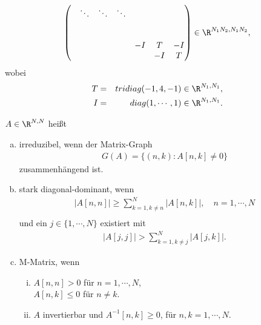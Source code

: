 \begin{Beispiel}
\begin{eqnarray*}
\begin{pmatrix}
                          & \ddots & \ddots & \ddots & & & \\
                          \\
                          \\
                          & & & & -I & T & -I \\
                          & & & & & -I & T
                       \end{pmatrix}
        \in \R^{N_1 N_2, N_1 N_2},
    \end{eqnarray*}
    wobei
    \begin{eqnarray*}
        T &=& tridiag(-1, 4, -1) \in \R^{N_1, N_1}, \\
        I &=& diag(1, \cdots, 1) \in \R^{N_1, N_1}.
    \end{eqnarray*}
\end{Beispiel}


\begin{Definition}
    \label{def:2.3}
    $A \in \R^{N, N}$ heißt
    \begin{enumerate}[a)]
	\item
	    irreduzibel, wenn der Matrix-Graph
	    \begin{eqnarray*}
            G(A) = \{(n, k) \colon A[n, k] \neq 0\}
	    \end{eqnarray*}
	    zusammenhängend ist.
	\item
	    stark diagonal-dominant, wenn
	    \begin{eqnarray*}
            |A[n, n]| \ge \sum_{k=1, k\neq n}^N |A[n, k]|, \quad n = 1, \cdots,
            N \\
	    \end{eqnarray*}
	    und ein $j \in \{1, \cdots, N\}$ existiert mit
	    \begin{eqnarray*}
            |A[j, j]| > \sum_{k=1, k\neq j}^N |A[j, k]|.
	    \end{eqnarray*}
	\item
	    M-Matrix, wenn
	    \begin{enumerate}[i)]
          \item
              $A[n, n] > 0$ für $n = 1, \cdots, N$, \\
              $A[n, k] \le 0$ für $n \neq k$.
          \item
              $A$ invertierbar und $A^{-1}[n, k] \ge 0$, für
              $n, k = 1, \cdots, N$.
	    \end{enumerate}
    \end{enumerate}
\end{Definition}


